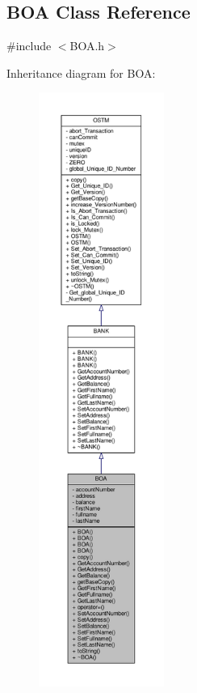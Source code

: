 \hypertarget{class_b_o_a}{}\subsection{B\+OA Class Reference}
\label{class_b_o_a}


{\ttfamily \#include $<$B\+O\+A.\+h$>$}



Inheritance diagram for B\+OA\+:
\nopagebreak
\begin{figure}[H]
\begin{center}
\leavevmode
\includegraphics[height=550pt]{class_b_o_a__inherit__graph}
\end{center}
\end{figure}


